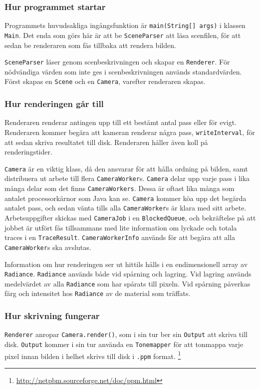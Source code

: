 \documentclass{article}
\begin{document}
\subsubsection{Hur programmet startar}
Programmets huvudsakliga ingångsfunktion är \texttt{main(String[]
  args)} i klassen \texttt{Main}. Det enda som görs här är att be
\texttt{SceneParser} att läsa scenfilen, för att sedan be renderaren
som fås tillbaka att rendera bilden.

\texttt{SceneParser} läser genom scenbeskrivningen och skapar en
\texttt{Renderer}. För nödvändiga värden som inte ges i
scenbeskrivningen används standardvärden. Först skapas en
\texttt{Scene} och en \texttt{Camera}, varefter renderaren skapas.

\subsubsection{Hur renderingen går till}
Renderaren renderar antingen upp till ett bestämt antal pass eller för
evigt. Renderaren kommer begära att kameran renderar några pass,
\texttt{writeInterval}, för att sedan skriva resultatet till
disk. Renderaren håller även koll på renderingstider.

\texttt{Camera} är en viktig klass, då den ansvarar för att hålla
ordning på bilden, samt distribuera ut arbete till flera
\texttt{CameraWorker}s. \texttt{Camera} delar upp varje pass i lika
många delar som det finns \texttt{CameraWorkers}. Dessa är oftast lika
många som antalet processorkärnor som Java kan se. \texttt{Camera}
kommer köa upp det begärda antalet pass, och sedan vänta tills alla
\texttt{CameraWorker}s är klara med sitt arbete. Arbetsuppgifter
skickas med \texttt{CameraJob} i en \texttt{BlockedQueue}, och
bekräftelse på att jobbet är utfört fås tillsammans med lite
information om lyckade och totala traces i en
\texttt{TraceResult}. \texttt{CameraWorkerInfo} används för att begära
att alla \texttt{CameraWorker}s ska avslutas.

Information om hur renderingen ser ut hittils hålls i en
endimensionell array av \texttt{Radiance}. \texttt{Radiance} används
både vid spårning och lagring. Vid lagring används medelvärdet av alla
\texttt{Radiance} som har spårats till pixeln. Vid spårning påverkas
färg och intensitet hos \texttt{Radiance} av de material som träffats.

\subsubsection{Hur skrivning fungerar}
\texttt{Renderer} anropar \texttt{Camera.render()}, som i sin tur ber
sin \texttt{Output} att skriva till disk. \texttt{Output} kommer i sin
tur använda en \texttt{Tonemapper} för att tonmappa varje pixel innan
bilden i helhet skrivs till disk i \texttt{.ppm} format.
\footnote{\url{http://netpbm.sourceforge.net/doc/ppm.html}}
\end{document}
